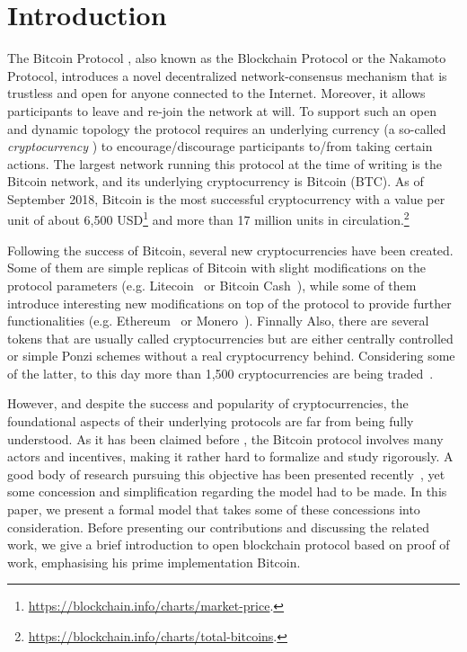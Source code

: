 
\section{Introduction}

The Bitcoin Protocol \cite{Bitcoin,DBLP:books/daglib/0040621,NC17}, also known as the Blockchain Protocol or the Nakamoto Protocol, introduces a novel decentralized network-consensus mechanism that is trustless 
and open for anyone connected to the Internet. Moreover, it allows participants to leave and re-join the network at will. To support such an open and dynamic topology the protocol requires an underlying currency (a so-called \emph{cryptocurrency} \cite{NC17}) to encourage/discourage participants to/from taking certain actions. The largest network running this protocol at the time of writing is the Bitcoin network, and its underlying cryptocurrency is Bitcoin (BTC). As of September 2018, Bitcoin is the most successful cryptocurrency with a value per unit of about 6,500 USD\footnote{\url{https://blockchain.info/charts/market-price}.}
and more than 17 million units in circulation.\footnote{\url{https://blockchain.info/charts/total-bitcoins}.}
 
Following the success of Bitcoin, several new cryptocurrencies have been created. Some of them are simple replicas of Bitcoin with slight modifications on the protocol parameters (e.g. Litecoin~\cite{Litecoin} or Bitcoin Cash~\cite{Bcash}), while some of them introduce interesting new modifications on top of the protocol to provide further functionalities (e.g. Ethereum~\cite{Ethereum,E17} or Monero~\cite{Monero}).
Finnally  Also, there are several tokens that are usually called cryptocurrencies but are either centrally controlled or simple Ponzi schemes without a real cryptocurrency behind.
Considering some of the latter, to this day more than 1,500 cryptocurrencies are being traded~\cite{coinmarketcap}.

However, and despite the success and popularity of cryptocurrencies, the foundational aspects of their underlying protocols are far from being fully understood. As it has been claimed before \cite{mininggames:2016}, the Bitcoin protocol involves many actors and incentives, making it rather hard to formalize and study rigorously. A good body of research pursuing this objective has been presented recently~\cite{mininggames:2016,optimalselfishmining2017,instabilitywithoutreward:2016,selfishmining2014,stop_selfish_mining2014,eclipseattacks2015,LBSZR15,LJG15,stubborn_mining:2016,economics_of_mining2013,ZGR17,ABLZ17,MHG18,SZWTK18}, yet some concession and simplification regarding the model had to be made.
In this paper, we present a formal model that takes some of these concessions into consideration. Before presenting our contributions and discussing the related work, we give a brief introduction to open blockchain protocol based on proof of work, emphasising his prime implementation Bitcoin. 

